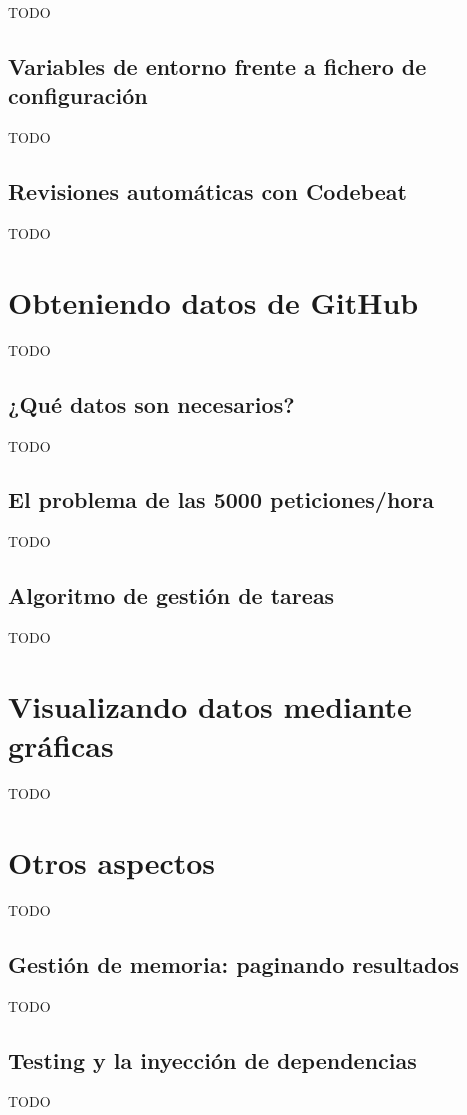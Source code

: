 TODO

\subsection{Variables de entorno frente a fichero de configuración}

TODO

\subsection{Revisiones automáticas con Codebeat}

TODO

\section{Obteniendo datos de GitHub}

TODO

\subsection{¿Qué datos son necesarios?}

TODO

\subsection{El problema de las 5000 peticiones/hora}

TODO

\subsection{Algoritmo de gestión de tareas}

TODO

\section{Visualizando datos mediante gráficas}

TODO

\section{Otros aspectos}

TODO

\subsection{Gestión de memoria: paginando resultados}

TODO

\subsection{Testing y la inyección de dependencias}

TODO